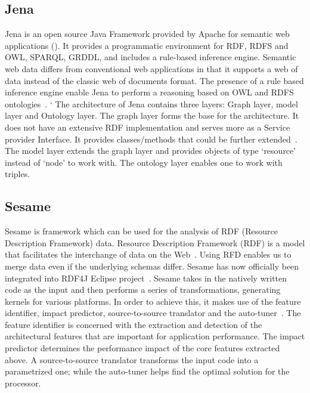 {     \pv

\subsection{Jena }

Jena is an open source Java Framework provided by Apache for semantic
web applications (\cite{www-w3-jena}). It provides a programmatic
environment for RDF, RDFS and OWL, SPARQL, GRDDL, and includes a
rule-based inference engine. Semantic web data differs from
conventional web applications in that it supports a web of data
instead of the classic web of documents format. The presence of a rule
based inference engine enable Jena to perform a reasoning based on OWL
and RDFS ontologies~\cite{www-trimc-nlp-blogspot}. ` The architecture
of Jena contains three layers: Graph layer, model layer and Ontology
layer. The graph layer forms the base for the architecture. It does
not have an extensive RDF implementation and serves more as a Service
provider Interface. It provides classes/methods that could be further
extended~\cite{www-trimc-nlp-blogspot}.  The model layer extends the
graph layer and provides objects of type ‘resource’ instead of ‘node’
to work with.  The ontology layer enables one to work with triples.

     \pv

\subsection{Sesame}

Sesame is framework which can be used for the analysis of RDF
(Resource Description Framework) data.  Resource Description Framework
(RDF) is a model that facilitates the interchange of data on the
Web~\cite{www-RDF}.  Using RFD enables us to merge data even if the
underlying schemas differ.  Sesame has now officially been integrated
into RDF4J Eclipse project~\cite{www-sesame}.  Sesame takes in the
natively written code as the input and then performs a series of
transformations, generating kernels for various platforms.  In order
to achieve this, it makes use of the feature identifier, impact
predictor, source-to-source translator and the
auto-tuner~\cite{sesame-paper-2013}.  The feature identifier is
concerned with the extraction and detection of the architectural
features that are important for application performance.  The impact
predictor determines the performance impact of the core features
extracted above.  A source-to-source translator transforms the input
code into a parametrized one; while the auto-tuner helps find the
optimal solution for the processor.

}
